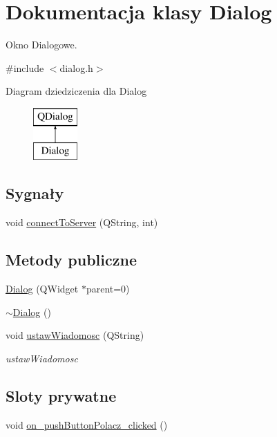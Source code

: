 \hypertarget{classDialog}{\section{Dokumentacja klasy Dialog}
\label{classDialog}
}


Okno Dialogowe.  




{\ttfamily \#include $<$dialog.\-h$>$}

Diagram dziedziczenia dla Dialog\begin{figure}[H]
\begin{center}
\leavevmode
\includegraphics[height=2.000000cm]{dc/d06/classDialog}
\end{center}
\end{figure}
\subsection*{Sygnały}
\begin{DoxyCompactItemize}
\item 
void \hyperlink{classDialog_a88d467b80921a394962d27edb36180f6}{connect\-To\-Server} (Q\-String, int)
\end{DoxyCompactItemize}
\subsection*{Metody publiczne}
\begin{DoxyCompactItemize}
\item 
\hyperlink{classDialog_acfa2063f9f962d394c6a645b6e7e08d8}{Dialog} (Q\-Widget $\ast$parent=0)
\item 
\hyperlink{classDialog_a2a1fe6ef28513eed13bfcd3a4da83ccb}{$\sim$\-Dialog} ()
\item 
void \hyperlink{classDialog_ab2375beb017973ea416f1c3f3494c100}{ustaw\-Wiadomosc} (Q\-String)
\begin{DoxyCompactList}\small\item\em ustaw\-Wiadomosc \end{DoxyCompactList}\end{DoxyCompactItemize}
\subsection*{Sloty prywatne}
\begin{DoxyCompactItemize}
\item 
void \hyperlink{classDialog_ae3619019db8ba37af8a2b30491272a28}{on\-\_\-push\-Button\-Polacz\-\_\-clicked} ()
\end{DoxyCompactItemize}
